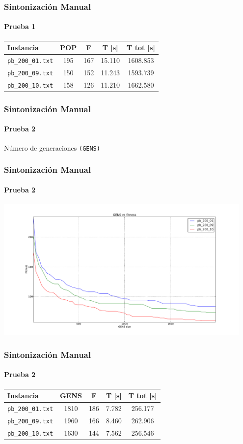 \frame
{
\frametitle{Sintonización Manual}
\framesubtitle{Prueba 1}
\begin{center}
\begin{tabular}{|l|c|c|c|c|}
    \hline
    \textbf{Instancia} & \textbf{POP} & \textbf{F} & \textbf{T [s] } & \textbf{T tot [s] }\\\hline
    \texttt{pb\_200\_01.txt} & 195 & 167 & 15.110 & 1608.853 \\\hline
    \texttt{pb\_200\_09.txt} & 150 & 152 & 11.243 & 1593.739 \\\hline
    \texttt{pb\_200\_10.txt} & 158 & 126 & 11.210 & 1662.580 \\\hline
\end{tabular}
\end{center}
}


\frame
{
\frametitle{Sintonización Manual}
\framesubtitle{Prueba 2}

\vspace{1cm}
\begin{center}
    Número de generaciones \texttt{(GENS)}
\end{center}
}

\frame
{
\frametitle{Sintonización Manual}
\framesubtitle{Prueba 2}

\begin{center}
    \includegraphics[width=0.95\textwidth]{../doc/img/2.pdf}
\end{center}
}

\frame
{
\frametitle{Sintonización Manual}
\framesubtitle{Prueba 2}
\begin{center}
\begin{tabular}{|l|c|c|c|c|}
    \hline
    \textbf{Instancia} & \textbf{GENS} &\textbf{F} & \textbf{T [s] } & \textbf{T tot [s]}\\\hline
    \texttt{pb\_200\_01.txt} & 1810 & 186 & 7.782 & 256.177 \\\hline
    \texttt{pb\_200\_09.txt} & 1960 & 166 & 8.460 & 262.906 \\\hline
    \texttt{pb\_200\_10.txt} & 1630 & 144 & 7.562 & 256.546 \\\hline
\end{tabular}
\end{center}
}


